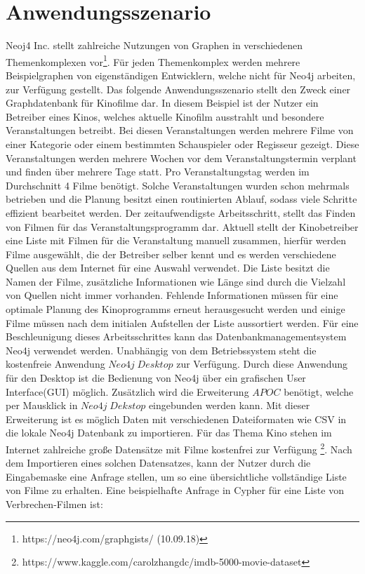 \section{Anwendungsszenario}
Neoj4 Inc. stellt zahlreiche Nutzungen von Graphen in verschiedenen Themenkomplexen vor\footnote{https://neo4j.com/graphgists/ (10.09.18)}. Für jeden Themenkomplex werden mehrere Beispielgraphen von eigenständigen Entwicklern, welche nicht für Neo4j arbeiten, zur Verfügung gestellt. Das folgende Anwendungsszenario stellt den Zweck einer Graphdatenbank für Kinofilme dar.\newline
In diesem Beispiel ist der Nutzer ein Betreiber eines Kinos, welches aktuelle Kinofilm ausstrahlt und besondere Veranstaltungen betreibt. Bei diesen Veranstaltungen werden mehrere Filme von einer Kategorie oder einem bestimmten Schauspieler oder Regisseur gezeigt. Diese Veranstaltungen werden mehrere Wochen vor dem Veranstaltungstermin verplant und finden über mehrere Tage statt. Pro Veranstaltungstag werden im Durchschnitt 4 Filme benötigt. Solche Veranstaltungen wurden schon mehrmals betrieben und die Planung besitzt einen routinierten Ablauf, sodass viele Schritte effizient bearbeitet werden. Der zeitaufwendigste Arbeitsschritt, stellt das Finden von Filmen für das Veranstaltungsprogramm dar. \newline
Aktuell stellt der Kinobetreiber eine Liste mit Filmen für die Veranstaltung manuell zusammen, hierfür werden Filme ausgewählt, die der Betreiber selber kennt und es werden verschiedene Quellen aus dem Internet für eine Auswahl verwendet. Die Liste besitzt die Namen der Filme, zusätzliche Informationen wie Länge sind durch die Vielzahl von Quellen nicht immer vorhanden. Fehlende Informationen müssen für eine optimale Planung des Kinoprogramms erneut herausgesucht werden und einige Filme müssen nach dem initialen Aufstellen der Liste  aussortiert werden. \newline  
Für eine Beschleunigung dieses Arbeitsschrittes kann das Datenbankmanagementsystem Neo4j verwendet werden. Unabhängig von dem Betriebssystem steht die kostenfreie Anwendung $Neo4j\; Desktop$ zur Verfügung. Durch diese Anwendung für den Desktop ist die Bedienung von Neo4j über ein grafischen User Interface(GUI) möglich. Zusätzlich wird die Erweiterung $APOC$ benötigt, welche per Mausklick in $Neo4j\; Dekstop$ eingebunden werden kann. Mit dieser Erweiterung ist es möglich Daten mit verschiedenen Dateiformaten wie CSV in die lokale Neo4j Datenbank zu importieren. Für das Thema Kino stehen im Internet zahlreiche große Datensätze mit Filme kostenfrei zur Verfügung \footnote{https://www.kaggle.com/carolzhangdc/imdb-5000-movie-dataset}. Nach dem Importieren eines solchen Datensatzes, kann der Nutzer durch die Eingabemaske eine Anfrage stellen, um so eine übersichtliche vollständige Liste von Filme zu erhalten. Eine beispielhafte Anfrage in Cypher für eine Liste von Verbrechen-Filmen ist: 
